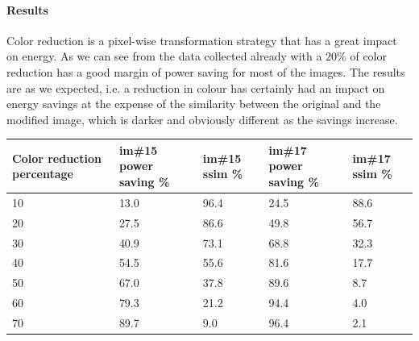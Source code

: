 \documentclass[a4paper]{article}
\begin{document}
            \paragraph{Results}
            Color reduction is a pixel-wise transformation strategy that has a great impact on energy. As we can see from the data collected already with a $20\%$ of color reduction has a good margin of power saving for most of the images.
            The results are as we expected, i.e. a reduction in colour has certainly had an impact on energy savings at the expense of the similarity between the original and the modified image, which is darker and obviously different as the savings increase.

            \begin{center}
            \begin{tabular}{@{}lllll@{}}
            \toprule
{\color[HTML]{000000} Color reduction percentage} & {\color[HTML]{000000} im\#15 power saving \%} & im\#15 ssim \% & {\color[HTML]{000000} im\#17 power saving  \%} & im\#17 ssim \% \\ \midrule
10                                                & 13.0                                          & 96.4           & 24.5                                           & 88.6           \\
20                                                & 27.5                                          & 86.6           & 49.8                                           & 56.7           \\
30                                                & 40.9                                          & 73.1           & 68.8                                           & 32.3           \\
40                                                & 54.5                                          & 55.6           & 81.6                                           & 17.7           \\
50                                                & 67.0                                          & 37.8           & 89.6                                           & 8.7            \\
60                                                & 79.3                                          & 21.2           & 94.4                                           & 4.0            \\
70                                                & 89.7                                          & 9.0            & 96.4                                           & 2.1            \\

\end{tabular}
\end{center}
\end{document}

